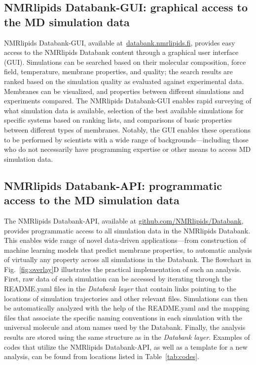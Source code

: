 \documentclass[fleqn,10pt]{wlscirep}
\begin{document}
\subsection{NMRlipids Databank-GUI: graphical access to the MD simulation data}\label{section:access}
NMRlipids Databank-GUI, available at~\href{https://www.databank.nmrlipids.fi}{databank.nmrlipids.fi}, provides easy access to the NMRlipids Databank content through a graphical user interface (GUI). Simulations can be searched based on their molecular composition, force field, temperature, membrane properties, and quality; the search results are ranked based on the simulation quality as evaluated against experimental data. Membranes can be visualized, and properties between different simulations and experiments compared. The NMRlipids Databank-GUI enables rapid surveying of what simulation data is available, selection of the best available simulations for specific systems based on ranking lists, and comparisons of basic properties between different types of membranes. Notably, the GUI enables these operations to be performed by scientists with a wide range of backgrounds---including those who do not necessarily have programming expertise or other means to access MD simulation data. 

\subsection{NMRlipids Databank-API: programmatic access to the MD simulation data}
The NMRlipids Databank-API, available at \href{https://github.com/NMRlipids/Databank}{github.com/NMRlipids/Databank}, provides programmatic access to all simulation data in the NMRlipids Databank. This enables wide range of novel data-driven applications---from construction of machine learning models that predict membrane properties, to automatic analysis of virtually any property across all simulations in the Databank. The flowchart in Fig.~\ref{fig:overlay}D illustrates the practical implementation of such an analysis. First, raw data of each simulation can be accessed by iterating through the README.yaml files in the {\it Databank layer} that contain links pointing to the locations of simulation trajectories and other relevant files. Simulations can then be automatically analyzed with the help of the README.yaml and the mapping files that associate the specific naming conventions in each simulation with the universal molecule and atom names used by the Databank. Finally, the analysis results are stored using the same structure as in the {\it Databank layer}. Examples of codes that utilize the NMRlipids Databank-API, as well as a template for a new analysis, can be found from locations listed in Table~\ref{tab:codes}.
\end{document}
